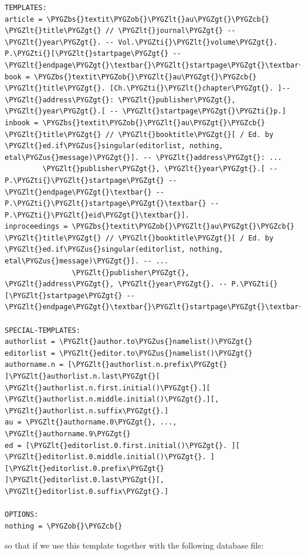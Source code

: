 \documentclass[letterpaper,10pt,english]{sphinxmanual}
\def\PYGZbs{\char`\\}
\def\PYGZus{\char`\_}
\def\PYGZob{\char`\{}
\def\PYGZcb{\char`\}}
\def\PYGZlt{\char`\<}
\def\PYGZgt{\char`\>}
\def\PYGZti{\char`\~}
\begin{document}
\begin{Verbatim}[commandchars=\\\{\}]
TEMPLATES:
article = \PYGZbs{}textit\PYGZob{}\PYGZlt{}au\PYGZgt{}\PYGZcb{} \PYGZlt{}title\PYGZgt{} // \PYGZlt{}journal\PYGZgt{} -- \PYGZlt{}year\PYGZgt{}. -- Vol.\PYGZti{}\PYGZlt{}volume\PYGZgt{}. P.\PYGZti{}[\PYGZlt{}startpage\PYGZgt{} -- \PYGZlt{}endpage\PYGZgt{}\textbar{}\PYGZlt{}startpage\PYGZgt{}\textbar{}\PYGZlt{}eid\PYGZgt{}\textbar{}].
book = \PYGZbs{}textit\PYGZob{}\PYGZlt{}au\PYGZgt{}\PYGZcb{} \PYGZlt{}title\PYGZgt{}. [Ch.\PYGZti{}\PYGZlt{}chapter\PYGZgt{}. ]-- \PYGZlt{}address\PYGZgt{}: \PYGZlt{}publisher\PYGZgt{}, \PYGZlt{}year\PYGZgt{}.[ -- \PYGZlt{}startpage\PYGZgt{}\PYGZti{}p.]
inbook = \PYGZbs{}textit\PYGZob{}\PYGZlt{}au\PYGZgt{}\PYGZcb{} \PYGZlt{}title\PYGZgt{} // \PYGZlt{}booktitle\PYGZgt{}[ / Ed. by \PYGZlt{}ed.if\PYGZus{}singular(editorlist, nothing, etal\PYGZus{}message)\PYGZgt{}]. -- \PYGZlt{}address\PYGZgt{}: ...
         \PYGZlt{}publisher\PYGZgt{}, \PYGZlt{}year\PYGZgt{}.[ -- P.\PYGZti{}\PYGZlt{}startpage\PYGZgt{} -- \PYGZlt{}endpage\PYGZgt{}\textbar{} -- P.\PYGZti{}\PYGZlt{}startpage\PYGZgt{}\textbar{} -- P.\PYGZti{}\PYGZlt{}eid\PYGZgt{}\textbar{}].
inproceedings = \PYGZbs{}textit\PYGZob{}\PYGZlt{}au\PYGZgt{}\PYGZcb{} \PYGZlt{}title\PYGZgt{} // \PYGZlt{}booktitle\PYGZgt{}[ / Ed. by \PYGZlt{}ed.if\PYGZus{}singular(editorlist, nothing, etal\PYGZus{}message)\PYGZgt{}]. -- ...
                \PYGZlt{}publisher\PYGZgt{}, \PYGZlt{}address\PYGZgt{}, \PYGZlt{}year\PYGZgt{}. -- P.\PYGZti{}[\PYGZlt{}startpage\PYGZgt{} -- \PYGZlt{}endpage\PYGZgt{}\textbar{}\PYGZlt{}startpage\PYGZgt{}\textbar{}\PYGZlt{}eid\PYGZgt{}\textbar{}].

SPECIAL-TEMPLATES:
authorlist = \PYGZlt{}author.to\PYGZus{}namelist()\PYGZgt{}
editorlist = \PYGZlt{}editor.to\PYGZus{}namelist()\PYGZgt{}
authorname.n = [\PYGZlt{}authorlist.n.prefix\PYGZgt{} ]\PYGZlt{}authorlist.n.last\PYGZgt{}[ \PYGZlt{}authorlist.n.first.initial()\PYGZgt{}.][ \PYGZlt{}authorlist.n.middle.initial()\PYGZgt{}.][,  \PYGZlt{}authorlist.n.suffix\PYGZgt{}.]
au = \PYGZlt{}authorname.0\PYGZgt{}, ..., \PYGZlt{}authorname.9\PYGZgt{}
ed = [\PYGZlt{}editorlist.0.first.initial()\PYGZgt{}. ][ \PYGZlt{}editorlist.0.middle.initial()\PYGZgt{}. ][\PYGZlt{}editorlist.0.prefix\PYGZgt{} ]\PYGZlt{}editorlist.0.last\PYGZgt{}[,  \PYGZlt{}editorlist.0.suffix\PYGZgt{}.]

OPTIONS:
nothing = \PYGZob{}\PYGZcb{}
\end{Verbatim}

so that if we use this template together with the following database file:
\end{document}
